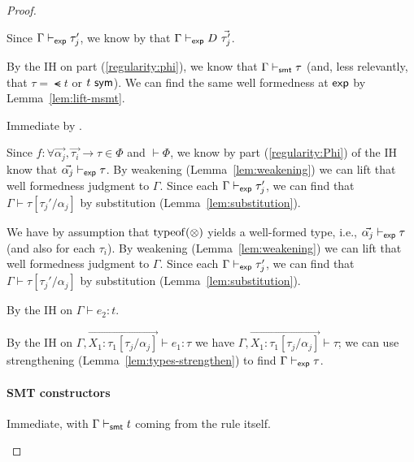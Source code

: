 \documentclass[acmsmall,screen,nonacm]{acmart}
\theoremstyle{definition}
\begin{document}
\begin{lemma}
\begin{proof}
\begin{proofcases}
  \item[(\rn{$e$-Ctor})] Since $\Gamma \vdash_{\mathsf{exp}} \tau_j'$, we know
  by  that $\Gamma \vdash_{\mathsf{exp}} D ~ \vec{\tau_j'}$.

  \item[(\rn{$e$-Quote})] By the IH on part (\ref{regularity:phi}), we
    know that $\Gamma \vdash_{\mathsf{smt}} \tau$ (and, less relevantly, that
    $\tau = \smt{t}$ or ${t} ~ \mathsf{sym}$). We can find the same well
    formedness at $\mathsf{exp}$ by Lemma~\ref{lem:lift-msmt}.

  \item[(\rn{$e$-Rel})] Immediate by .

  \item[(\rn{$e$-Fun})] Since $f
  : \forall \vec{\alpha_j}, \vec{\tau_i} \rightarrow \tau \in \Phi$
  and $\vdash \Phi$, we know by part (\ref{regularity:Phi}) of the IH
  know that $\vec{\alpha_j} \vdash_{\mathsf{exp}} \tau$. By weakening
  (Lemma~\ref{lem:weakening}) we can lift that well formedness
  judgment to $\Gamma$. Since each $\Gamma \vdash_{\mathsf{exp}} \tau_j'$, we
  can find that $\Gamma \vdash \tau[\tau_j'/\alpha_j]$ by substitution
  (Lemma~\ref{lem:substitution}).

  \item[(\rn{$e$-Fun})] We have by assumption that $\mathrm{typeof}(\otimes)$
  yields a well-formed type, i.e., $\vec{\alpha_j} \vdash_{\mathsf{exp}} \tau$
  (and also for each $\tau_i$). By weakening
  (Lemma~\ref{lem:weakening}) we can lift that well formedness
  judgment to $\Gamma$. Since each $\Gamma \vdash_{\mathsf{exp}} \tau_j'$, we
  can find that $\Gamma \vdash \tau[\tau_j'/\alpha_j]$ by substitution
  (Lemma~\ref{lem:substitution}).

  \item[(\rn{$e$-If})] By the IH on $\Gamma \vdash e_2 : t$.

  \item[(\rn{$e$-Match})] By the IH on
  $\Gamma, \overrightarrow{X_1:\tau_1[\tau_j/\alpha_j]} \vdash e_1
  : \tau$ we have
  $\Gamma, \overrightarrow{X_1:\tau_1[\tau_j/\alpha_j]} \vdash \tau$;
  we can use strengthening (Lemma~\ref{lem:types-strengthen}) to find
  $\Gamma \vdash_{\mathsf{exp}} \tau$.

\end{proofcases}

\paragraph*{SMT constructors}
%
\begin{proofcases}
  \item[(\rn{$c$-SMT-Var})] Immediate, with $\Gamma \vdash_{\mathsf{smt}} t$
  coming from the rule itself.


\end{proofcases}
\end{proof}
\end{lemma}
\end{document}
